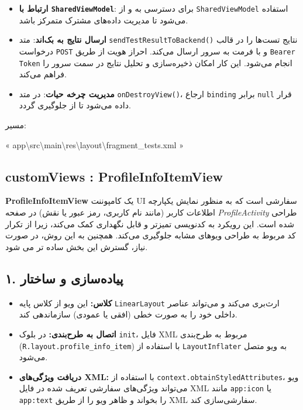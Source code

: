\documentclass{report}
\begin{document}
\begin{itemize}
	\item \textbf{ارتباط با \texttt{SharedViewModel}}: برای دسترسی به  و  از \texttt{SharedViewModel} استفاده می‌شود تا مدیریت داده‌های مشترک متمرکز باشد.
	\item \textbf{ارسال نتایج به بک‌اند}: متد \texttt{sendTestResultToBackend()} نتایج تست‌ها را در قالب درخواست \texttt{POST} و با فرمت  به سرور ارسال می‌کند. 
	احراز هویت از طریق \texttt{Bearer Token} انجام می‌شود. این کار امکان ذخیره‌سازی و تحلیل نتایج در سمت سرور را فراهم می‌کند.
	\item \textbf{مدیریت چرخه حیات}: در متد \texttt{onDestroyView()}، ارجاع \texttt{binding} برابر \texttt{null} قرار داده می‌شود تا از  جلوگیری گردد.
\end{itemize}
\begin{note}{مسیر:}
	\begin{latin}
		« app\textbackslash src\textbackslash main\textbackslash res\textbackslash layout\textbackslash fragment\_tests.xml »
	\end{latin}
\end{note}

\subsection{customViews :  ProfileInfoItemView}


\textbf{ProfileInfoItemView} یک کامپوننت UI سفارشی است که به منظور نمایش یکپارچه اطلاعات کاربر (مانند نام کاربری، رمز عبور یا نقش) در صفحه \textit{ProfileActivity} طراحی شده است. این رویکرد به کدنویسی تمیزتر و قابل نگهداری کمک می‌کند، زیرا از تکرار کد مربوط به طراحی ویوهای مشابه جلوگیری می‌کند. همچنین به این روش، در صورت نیاز،  گسترش این بخش ساده تر می شود.

\subsection*{۱. پیاده‌سازی و ساختار}
\begin{itemize}
	\item \textbf{کلاس:} این ویو از کلاس پایه \texttt{LinearLayout} ارث‌بری می‌کند و می‌تواند عناصر داخلی خود را به صورت خطی (افقی یا عمودی) سازماندهی کند.
	\item \textbf{اتصال به طرح‌بندی:} در بلوک \texttt{init}، فایل XML مربوط به طرح‌بندی (\texttt{R.layout.profile\_info\_item}) با استفاده از \texttt{LayoutInflater} به ویو متصل می‌شود.
	\item \textbf{دریافت ویژگی‌های XML:} با استفاده از \texttt{context.obtainStyledAttributes}، ویو می‌تواند ویژگی‌های سفارشی تعریف شده در فایل XML مانند \texttt{app:icon} یا \texttt{app:text} را بخواند و ظاهر ویو را از طریق XML سفارشی‌سازی کند.
\end{itemize}
\end{document}

